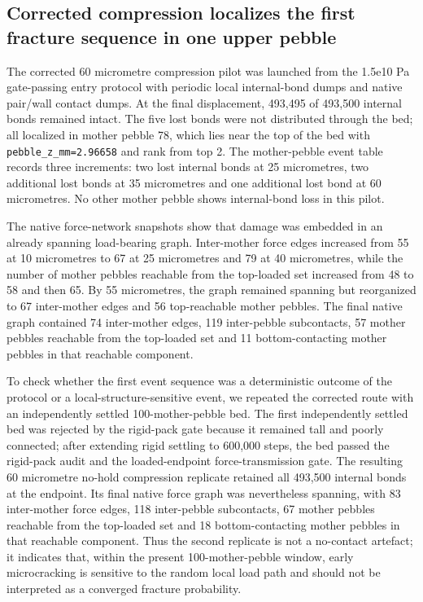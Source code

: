 \documentclass[5p,twocolumn]{elsarticle}
\begin{document}
\subsection{Corrected compression localizes the first fracture sequence in one upper pebble}

The corrected 60 micrometre compression pilot was launched from the 1.5e10 Pa gate-passing entry protocol with periodic local internal-bond dumps and native pair/wall contact dumps. At the final displacement, 493,495 of 493,500 internal bonds remained intact. The five lost bonds were not distributed through the bed; all localized in mother pebble 78, which lies near the top of the bed with \texttt{pebble\_z\_mm=2.96658} and rank from top 2. The mother-pebble event table records three increments: two lost internal bonds at 25 micrometres, two additional lost bonds at 35 micrometres and one additional lost bond at 60 micrometres. No other mother pebble shows internal-bond loss in this pilot.


The native force-network snapshots show that damage was embedded in an already spanning load-bearing graph. Inter-mother force edges increased from 55 at 10 micrometres to 67 at 25 micrometres and 79 at 40 micrometres, while the number of mother pebbles reachable from the top-loaded set increased from 48 to 58 and then 65. By 55 micrometres, the graph remained spanning but reorganized to 67 inter-mother edges and 56 top-reachable mother pebbles. The final native graph contained 74 inter-mother edges, 119 inter-pebble subcontacts, 57 mother pebbles reachable from the top-loaded set and 11 bottom-contacting mother pebbles in that reachable component.


To check whether the first event sequence was a deterministic outcome of the protocol or a local-structure-sensitive event, we repeated the corrected route with an independently settled 100-mother-pebble bed. The first independently settled bed was rejected by the rigid-pack gate because it remained tall and poorly connected; after extending rigid settling to 600,000 steps, the bed passed the rigid-pack audit and the loaded-endpoint force-transmission gate. The resulting 60 micrometre no-hold compression replicate retained all 493,500 internal bonds at the endpoint. Its final native force graph was nevertheless spanning, with 83 inter-mother force edges, 118 inter-pebble subcontacts, 67 mother pebbles reachable from the top-loaded set and 18 bottom-contacting mother pebbles in that reachable component. Thus the second replicate is not a no-contact artefact; it indicates that, within the present 100-mother-pebble window, early microcracking is sensitive to the random local load path and should not be interpreted as a converged fracture probability.
\end{document}
